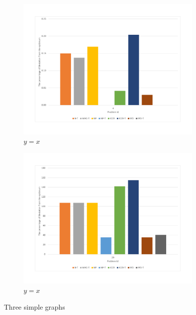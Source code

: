 \begin{figure}
	\centering
	\begin{subfigure}{0.45\textwidth}
		\includegraphics[width=\textwidth]{images/EnergyDeviationSmallProblem.pdf}
		\caption{$y=x$}
		\label{fig:SmallProblemEnergy}
	\end{subfigure}
	\hfill
	\begin{subfigure}{0.45\textwidth}
		\includegraphics[width=\textwidth]{images/EnergyDeviationMediumProblem.pdf}
		\caption{$y=x$}
		\label{fig:MediumProblemEnergy}
	\end{subfigure}    
	\caption{Three simple graphs}
	\label{fig:SmallMediumProblemEnergy}    
\end{figure}


